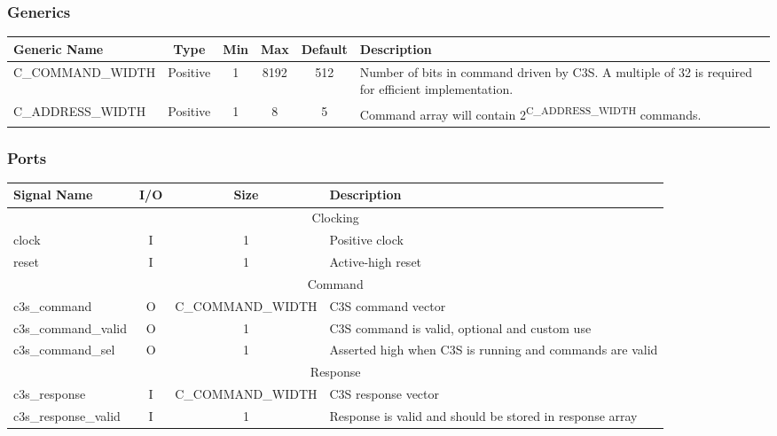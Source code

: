 \subsubsection{Generics}
\begin{center}
  \begin{tabular}{ l | c | c | c | c | p{.3\linewidth} }
    Generic Name      & Type     & Min & Max  & Default & Description \\
    \hline
    C\_COMMAND\_WIDTH & Positive & 1   & 8192 & 512     & Number of bits in command driven by C3S. A multiple of 32 is required for efficient implementation. \\
    \hline
    C\_ADDRESS\_WIDTH & Positive & 1   & 8    & 5       & Command array will contain 2\textsuperscript{C\_ADDRESS\_WIDTH} commands. \\
  \end{tabular}
\end{center}

\subsubsection{Ports}
\begin{center}
  \begin{tabular}{ l | c | c | p{.3\linewidth} }
    Signal Name          & I/O & Size              & Description \\
    \hline
    \multicolumn{4}{c}{Clocking} \\
    \hline
    clock                & I   & 1                 & Positive clock \\
    \hline
    reset                & I   & 1                 & Active-high reset \\
    \hline
    \multicolumn{4}{c}{Command} \\
    \hline
    c3s\_command         & O   & C\_COMMAND\_WIDTH & C3S command vector \\
    \hline
    c3s\_command\_valid  & O   & 1                 & C3S command is valid, optional and custom use \\
    \hline
    c3s\_command\_sel    & O   & 1                 & Asserted high when C3S is running and commands are valid \\
    \hline
    \multicolumn{4}{c}{Response} \\
    \hline
    c3s\_response        & I   & C\_COMMAND\_WIDTH & C3S response vector \\
    \hline
    c3s\_response\_valid & I   & 1                 & Response is valid and should be stored in response array \\
  \end{tabular}
\end{center}

